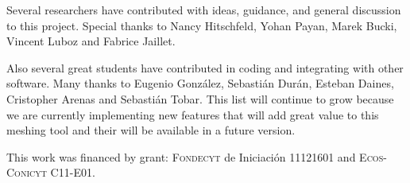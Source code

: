 \documentclass[10pt]{article}
\begin{document}
Several researchers have contributed with ideas, guidance, and general discussion to this project. Special thanks to Nancy Hitschfeld, Yohan Payan, Marek Bucki, Vincent Luboz and Fabrice Jaillet.

Also several great students have contributed in coding and integrating with other software. Many thanks to Eugenio Gonz\'alez, Sebasti\'an Dur\'an, Esteban Daines, Cristopher Arenas and Sebasti\'an Tobar. This list will continue to grow because we are currently implementing new features that will add great value to this meshing tool and their will be available in a future version.


This work was financed by grant: \textsc{Fondecyt} de Iniciaci\'on 11121601 and \textsc{Ecos-Conicyt} C11-E01.
 
 

\end{document}

